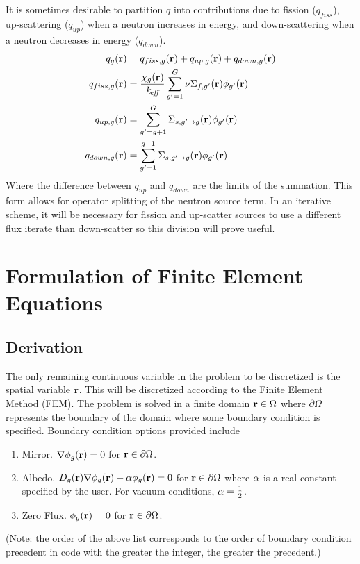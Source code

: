   It is sometimes desirable to partition $q$ into contributions due 
  to fission ($q_{fiss}$), up-scattering ($q_{up}$) when a neutron increases in 
  energy, and down-scattering when a neutron decreases in energy ($q_{down}$).
  \begin{align}
    q_g(\mathbf{r}) &= q_{fiss,g}(\mathbf{r}) + q_{up,g}(\mathbf{r}) + q_{down,g}(\mathbf{r}) \\
    \label{eq:qfiss}
    q_{fiss,g}(\mathbf{r}) &= \frac{\chi_g(\mathbf{r})}{k_{\!\mbox{\scriptsize \em eff}}} \sum_{g'=1}^{G} 
      \nu \Sigma_{f,g'}(\mathbf{r}) \phi_{g'}(\mathbf{r}) \\
    \label{eq:qup}
    q_{up,g}(\mathbf{r}) &= \sum_{g'=g+1}^{G} \Sigma_{s,g' \rightarrow g}(\mathbf{r})
      \phi_{g'}(\mathbf{r}) \\
    \label{eq:qdown}
    q_{down,g}(\mathbf{r}) &= \sum_{g'=1}^{g-1} \Sigma_{s,g' \rightarrow g}(\mathbf{r})
      \phi_{g'}(\mathbf{r})
  \end{align}
  Where the difference between $q_{up}$ and $q_{down}$ are the limits of the 
  summation. This form allows for operator splitting of the neutron source term.
  In an iterative scheme, it will be necessary for fission and up-scatter 
  sources to use a different flux iterate than down-scatter so this division
  will prove useful.

\section{Formulation of Finite Element Equations}
  \subsection{Derivation}
    \label{sec:formulation:derivation}
    The only remaining continuous variable in the problem to be discretized is 
    the spatial variable $\mathbf{r}$. This will be discretized according to the Finite 
    Element  Method (FEM). The problem is solved in a finite domain 
    $\mathbf{r} \in \Omega$ where $\partial \Omega$ represents the boundary of the 
    domain where some boundary condition is specified. Boundary condition 
    options provided include
    \begin{enumerate}
      \item Mirror. $\mathbf{\nabla} \phi_g(\mathbf{r}) = 0$ for $\mathbf{r} \in \partial \Omega$.
      \item Albedo. $D_g(\mathbf{r}) \mathbf{\nabla} \phi_g(\mathbf{r}) + \alpha \phi_g(\mathbf{r})=0$ for 
        $\mathbf{r} \in \partial \Omega$ where $\alpha$ is a real constant specified
        by the user. For vacuum conditions, $\alpha = \frac{1}{2}$.
      \item Zero Flux. $\phi_g(\mathbf{r}) = 0$ for $\mathbf{r} \in \partial \Omega$.
    \end{enumerate}
    (Note: the order of the above list corresponds to the order of boundary 
    condition precedent in code with the greater the integer, the greater the 
    precedent.)
    
